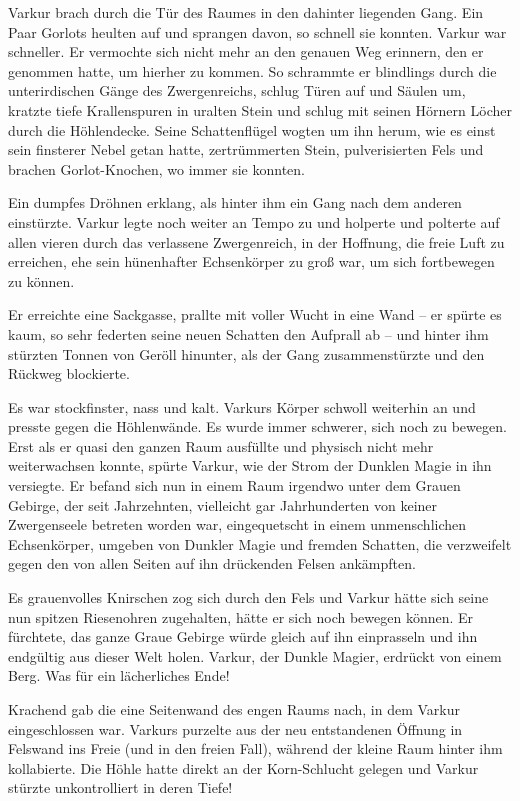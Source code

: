 \documentclass[10pt, a4paper, oneside]{book}
\begin{document}
Varkur brach durch die Tür des Raumes in den dahinter liegenden Gang. Ein Paar Gorlots heulten auf und sprangen davon, so schnell sie konnten. Varkur war schneller. Er vermochte sich nicht mehr an den genauen Weg erinnern, den er genommen hatte, um hierher zu kommen. So schrammte er blindlings durch die unterirdischen Gänge des Zwergenreichs, schlug Türen auf und Säulen um, kratzte tiefe Krallenspuren in uralten Stein und schlug mit seinen Hörnern Löcher durch die Höhlendecke. Seine Schattenflügel wogten um ihn herum, wie es einst sein finsterer Nebel getan hatte, zertrümmerten Stein, pulverisierten Fels und brachen Gorlot-Knochen, wo immer sie konnten.

Ein dumpfes Dröhnen erklang, als hinter ihm ein Gang nach dem anderen einstürzte. Varkur legte noch weiter an Tempo zu und holperte und polterte auf allen vieren durch das verlassene Zwergenreich, in der Hoffnung, die freie Luft zu erreichen, ehe sein hünenhafter Echsenkörper zu groß war, um sich fortbewegen zu können.

Er erreichte eine Sackgasse, prallte mit voller Wucht in eine Wand – er spürte es kaum, so sehr federten seine neuen Schatten den Aufprall ab – und hinter ihm stürzten Tonnen von Geröll hinunter, als der Gang zusammenstürzte und den Rückweg blockierte.

Es war stockfinster, nass und kalt. Varkurs Körper schwoll weiterhin an und presste gegen die Höhlenwände. Es wurde immer schwerer, sich noch zu bewegen. Erst als er quasi den ganzen Raum ausfüllte und physisch nicht mehr weiterwachsen konnte, spürte Varkur, wie der Strom der Dunklen Magie in ihn versiegte. Er befand sich nun in einem Raum irgendwo unter dem Grauen Gebirge, der seit Jahrzehnten, vielleicht gar Jahrhunderten von keiner Zwergenseele betreten worden war, eingequetscht in einem unmenschlichen Echsenkörper, umgeben von Dunkler Magie und fremden Schatten, die verzweifelt gegen den von allen Seiten auf ihn drückenden Felsen ankämpften.

Es grauenvolles Knirschen zog sich durch den Fels und Varkur hätte sich seine nun spitzen Riesenohren zugehalten, hätte er sich noch bewegen können. Er fürchtete, das ganze Graue Gebirge würde gleich auf ihn einprasseln und ihn endgültig aus dieser Welt holen. Varkur, der Dunkle Magier, erdrückt von einem Berg. Was für ein lächerliches Ende!

Krachend gab die eine Seitenwand des engen Raums nach, in dem Varkur eingeschlossen war. Varkurs purzelte aus der neu entstandenen Öffnung in Felswand ins Freie (und in den freien Fall), während der kleine Raum hinter ihm kollabierte. Die Höhle hatte direkt an der Korn-Schlucht gelegen und Varkur stürzte unkontrolliert in deren Tiefe!
\end{document}
